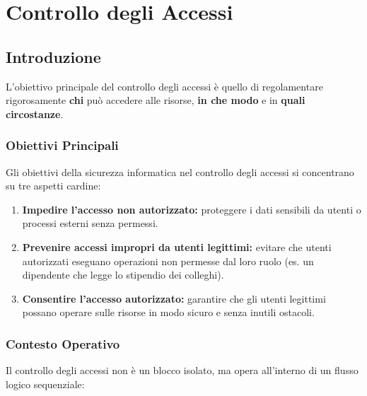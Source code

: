 \chapter{Controllo degli Accessi}

\section{Introduzione}

L'obiettivo principale del controllo degli accessi è quello di regolamentare rigorosamente \textbf{chi} può accedere alle risorse, \textbf{in che modo} e in \textbf{quali circostanze}. 

\subsection{Obiettivi Principali}
Gli obiettivi della sicurezza informatica nel controllo degli accessi si concentrano su tre aspetti cardine:
\begin{enumerate}
    \item \textbf{Impedire l'accesso non autorizzato:} proteggere i dati sensibili da utenti o processi esterni senza permessi.
    \item \textbf{Prevenire accessi impropri da utenti legittimi:} evitare che utenti autorizzati eseguano operazioni non permesse dal loro ruolo (es. un dipendente che legge lo stipendio dei colleghi).
    \item \textbf{Consentire l'accesso autorizzato:} garantire che gli utenti legittimi possano operare sulle risorse in modo sicuro e senza inutili ostacoli.
\end{enumerate}

\subsection{Contesto Operativo}
Il controllo degli accessi non è un blocco isolato, ma opera all'interno di un flusso logico sequenziale:

\begin{center}
\end{center}

